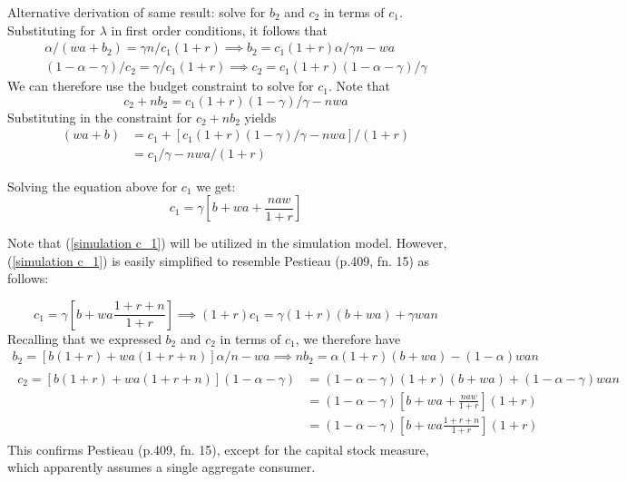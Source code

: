 \documentclass{article}
\begin{document}
Alternative derivation of same result: solve for $b_{2}$ and $c_{2}$ in terms of $c_{1}$.\\
Substituting for $\lambda$ in first order conditions, it follows that
\begin{gather}
\alpha/(wa+b_{2}) = \gamma n/ c_{1} (1+r) \implies b_{2} = c_{1} (1+r) \alpha /\gamma n - wa
\\
(1-\alpha-\gamma)/ c_{2} = \gamma / c_{1} (1+r)  \implies  c_{2} = c_{1}(1+r) (1-\alpha-\gamma)/\gamma
\end{gather}
We can therefore use the budget constraint to solve for $c_{1}$.
Note that
\begin{equation}
c_{2} + n b_{2} = c_{1}(1+r)(1-\gamma)/\gamma - nwa
\end{equation}
Substituting in the constraint for $c_{2} + n b_{2}$ yields
\begin{equation}
\begin{split}
(w a + b)
&= c_{1} + [c_{1}(1+r)(1-\gamma)/\gamma - nwa]/(1+r)
\\
&= c_{1}/\gamma - nwa/(1+r)
\end{split}
\end{equation}

Solving the equation above for $c_{1}$ we get:
\begin{equation}\label{simulation c_1}
c_{1} = \gamma[b + wa + \frac{naw}{1+r}]
\end{equation}

Note that (\ref{simulation c_1}) will be utilized in the simulation model.  However, (\ref{simulation c_1}) is easily simplified to resemble Pestieau (p.409, fn. 15) as follows:

\begin{equation}\label{opt c1 a}
c_{1} = \gamma[b + wa\frac{1+r+n} {1+r}] \implies
(1+r)c_{1} = \gamma(1+r)(b + wa) + \gamma wan 
\end{equation}
Recalling that we expressed $b_{2}$ and $c_{2}$ in terms of $c_{1}$, we therefore have
\begin{gather}
b_{2} =  [b(1+r) + wa(1+r+n)] \alpha /n - wa \implies nb_{2} = \alpha(1+r)(b+wa) - (1-\alpha)wan
\\
\begin{split}
c_{2} = [b(1+r) + wa(1+r+n)] (1-\alpha-\gamma) &= (1-\alpha-\gamma)(1+r)(b+wa) + (1-\alpha-\gamma)wan
\\
&= (1-\alpha -\gamma)[b+wa+\frac{naw}{1+r}](1+r)
\\
&= (1-\alpha -\gamma)[b+wa\frac{1+r+n}{1+r}](1+r)
\end{split}
\end{gather}
This confirms Pestieau (p.409, fn. 15), except for the capital stock measure,
which apparently assumes a single aggregate consumer.\newline
\end{document}
